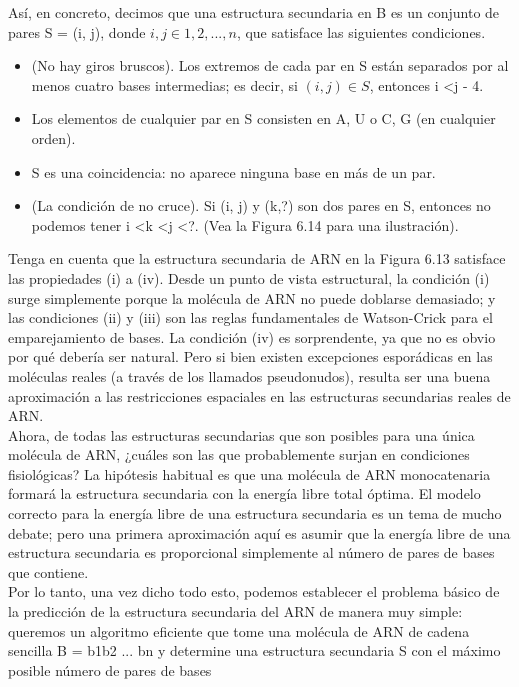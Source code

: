 \documentclass[a4paper, 12pt]{book}
\theoremstyle{dotless}
\begin{document}
Así, en concreto, decimos que una estructura secundaria en B es un conjunto de pares S = {(i, j)}, donde $i, j  \in  {1, 2,. . . , n}$, que satisface las siguientes condiciones.\\

\begin{itemize}
    \item (No hay giros bruscos). Los extremos de cada par en S están separados por al menos cuatro bases intermedias; es decir, si $(i, j)  \in  S$, entonces i <j - 4.
    \item Los elementos de cualquier par en S consisten en {A, U} o {C, G} (en cualquier orden).
    \item S es una coincidencia: no aparece ninguna base en más de un par.
    \item (La condición de no cruce). Si (i, j) y (k,?) son dos pares en S, entonces no podemos tener i <k <j <?. (Vea la Figura 6.14 para una ilustración).
\end{itemize}

Tenga en cuenta que la estructura secundaria de ARN en la Figura 6.13 satisface las propiedades (i) a (iv). Desde un punto de vista estructural, la condición (i) surge simplemente porque la molécula de ARN no puede doblarse demasiado; y las condiciones (ii) y (iii) son las reglas fundamentales de Watson-Crick para el emparejamiento de bases. La condición (iv) es sorprendente, ya que no es obvio por qué debería ser natural. Pero si bien existen excepciones esporádicas en las moléculas reales (a través de los llamados pseudonudos), resulta ser una buena aproximación a las restricciones espaciales en las estructuras secundarias reales de ARN.\\

Ahora, de todas las estructuras secundarias que son posibles para una única molécula de ARN, ¿cuáles son las que probablemente surjan en condiciones fisiológicas? La hipótesis habitual es que una molécula de ARN monocatenaria formará la estructura secundaria con la energía libre total óptima. El modelo correcto para la energía libre de una estructura secundaria es un tema de mucho debate; pero una primera aproximación aquí es asumir que la energía libre de una estructura secundaria es proporcional simplemente al número de pares de bases que contiene.\\

Por lo tanto, una vez dicho todo esto, podemos establecer el problema básico de la predicción de la estructura secundaria del ARN de manera muy simple: queremos un algoritmo eficiente que tome una molécula de ARN de cadena sencilla B = b1b2 ... bn y determine una estructura secundaria S con el máximo posible número de pares de bases
\end{document}
